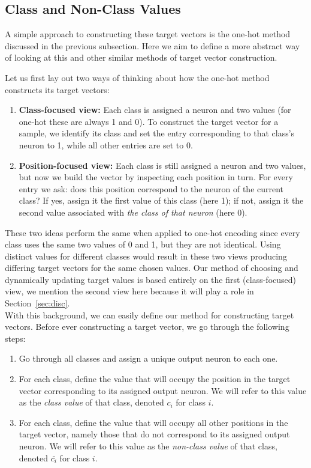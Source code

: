 \documentclass[12pt,fleqn,a4paper]{article}
\begin{document}
\subsection{Class and Non-Class Values}\label{sec:candnc}
A simple approach to constructing these target vectors is the one-hot method discussed in the previous subsection. Here we aim to define a more abstract way of looking at this and other similar methods of target vector construction. 

Let us first lay out two ways of thinking about how the one-hot method constructs its target vectors: 
\begin{enumerate}
\item \textbf{Class-focused view:} Each class is assigned a neuron and two values (for one-hot these are always 1 and 0). To construct the target vector for a sample, we identify its class and set the entry corresponding to that class's neuron to 1, while all other entries are set to 0.

\item \textbf{Position-focused view:} Each class is still assigned a neuron and two values, but now we build the vector by inspecting each position in turn. For every entry we ask: does this position correspond to the neuron of the current class? If yes, assign it the first value of this class (here 1); if not, assign it the second value associated with \textit{the class of that neuron} (here 0).

\end{enumerate}

These two ideas perform the same when applied to one-hot encoding since every class uses the same two values of 0 and 1, but they are not identical. Using distinct values for different classes would result in these two views producing differing target vectors for the same chosen values. Our method of choosing and dynamically updating target values is based entirely on the first (class-focused) view, we mention the second view here because it will play a role in Section~\ref{sec:disc}.\\

With this background, we can easily define our method for constructing target vectors. Before ever constructing a target vector, we go through the following steps:
\begin{enumerate}
    \item  Go through all classes and assign a unique output neuron to each one.
    \item For each class, define the value that will occupy the position in the target vector corresponding to its assigned output neuron. We will refer to this value as the \textit{class value} of that class, denoted $c_{i}$ for class $i$. 
    \item For each class, define the value that will occupy all other positions in the target vector, namely those that do not correspond to its assigned output neuron. We will refer to this value as the \textit{non-class value} of that class, denoted $\bar{c_{i}}$ for class $i$.
\end{enumerate}
\end{document}

